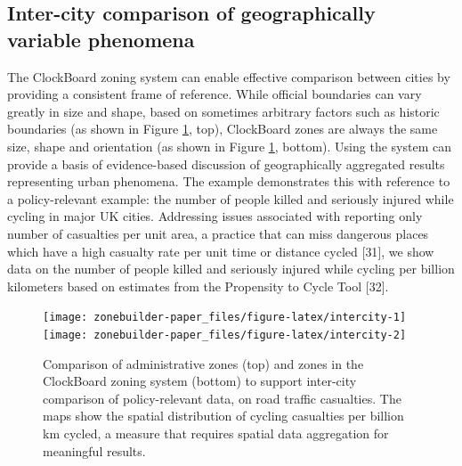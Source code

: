 \documentclass{josis}
\begin{document}
\hypertarget{inter-city-comparison-of-geographically-variable-phenomena}{%
\subsection{Inter-city comparison of geographically variable phenomena}\label{inter-city-comparison-of-geographically-variable-phenomena}}

The ClockBoard zoning system can enable effective comparison between cities by providing a consistent frame of reference.
While official boundaries can vary greatly in size and shape, based on sometimes arbitrary factors such as historic boundaries (as shown in Figure \ref{fig:intercity}, top), ClockBoard zones are always the same size, shape and orientation (as shown in Figure \ref{fig:intercity}, bottom).
Using the system can provide a basis of evidence-based discussion of geographically aggregated results representing urban phenomena.
The example demonstrates this with reference to a policy-relevant example: the number of people killed and seriously injured while cycling in major UK cities.
Addressing issues associated with reporting only number of casualties per unit area, a practice that can miss dangerous places which have a high casualty rate per unit time or distance cycled {[}31{]}, we show data on the number of people killed and seriously injured while cycling per billion kilometers based on estimates from the Propensity to Cycle Tool {[}32{]}.

\begin{figure}

{\centering \texttt{[image: zonebuilder-paper\_files/figure-latex/intercity-1]} \texttt{[image: zonebuilder-paper\_files/figure-latex/intercity-2]} 

}

\caption{Comparison of administrative zones (top) and zones in the ClockBoard zoning system (bottom) to support inter-city comparison of policy-relevant data, on road traffic casualties. The maps show the spatial distribution of cycling casualties per billion km cycled, a measure that requires spatial data aggregation for meaningful results.}\label{fig:intercity}
\end{figure}
\end{document}
